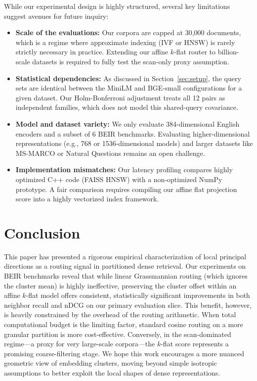\documentclass[sigconf,nonacm]{acmart}
\begin{document}
While our experimental design is highly structured, several key limitations suggest avenues for future inquiry:
\begin{itemize}
  \item \textbf{Scale of the evaluations:} Our corpora are capped at 30,000 documents, which is a regime where approximate indexing (IVF or HNSW) is rarely strictly necessary in practice. Extending our affine $k$-flat router to billion-scale datasets is required to fully test the scan-only proxy assumption.
  \item \textbf{Statistical dependencies:} As discussed in Section~\ref{sec:setup}, the query sets are identical between the MiniLM and BGE-small configurations for a given dataset. Our Holm-Bonferroni adjustment treats all 12 pairs as independent families, which does not model this shared-query covariance.
  \item \textbf{Model and dataset variety:} We only evaluate 384-dimensional English encoders and a subset of 6 BEIR benchmarks. Evaluating higher-dimensional representations (e.g., 768 or 1536-dimensional models) and larger datasets like MS-MARCO or Natural Questions remains an open challenge.
  \item \textbf{Implementation mismatches:} Our latency profiling compares highly optimized C++ code (FAISS HNSW) with a non-optimized NumPy prototype. A fair comparison requires compiling our affine flat projection score into a highly vectorized index framework.
\end{itemize}

\section{Conclusion}
\label{sec:concl}

This paper has presented a rigorous empirical characterization of local principal directions as a routing signal in partitioned dense retrieval. Our experiments on BEIR benchmarks reveal that while linear Grassmannian routing (which ignores the cluster mean) is highly ineffective, preserving the cluster offset within an affine $k$-flat model offers consistent, statistically significant improvements in both neighbor recall and nDCG on our primary evaluation slice. This benefit, however, is heavily constrained by the overhead of the routing arithmetic. When total computational budget is the limiting factor, standard cosine routing on a more granular partition is more cost-effective. Conversely, in the scan-dominated regime—a proxy for very large-scale corpora—the $k$-flat score represents a promising coarse-filtering stage. We hope this work encourages a more nuanced geometric view of embedding clusters, moving beyond simple isotropic assumptions to better exploit the local shapes of dense representations.
\end{document}
